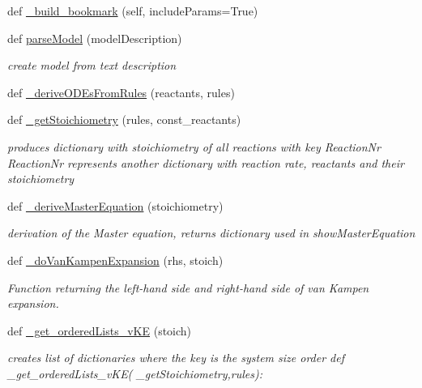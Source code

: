 \begin{DoxyCompactItemize}
def \hyperlink{namespace_mu_mo_t_1_1_mu_mo_t_a85df0ce1bbaa77b9e7bb2c86580ddbb1}{\+\_\+build\+\_\+bookmark} (self, include\+Params=True)
\item 
def \hyperlink{namespace_mu_mo_t_1_1_mu_mo_t_a8a03b36c690f28169c5c116d8e06116f}{parse\+Model} (model\+Description)
\begin{DoxyCompactList}\small\item\em create model from text description \end{DoxyCompactList}\item 
def \hyperlink{namespace_mu_mo_t_1_1_mu_mo_t_a139ce7eb800f1bebc88c8da1bea24d4f}{\+\_\+derive\+O\+D\+Es\+From\+Rules} (reactants, rules)
\item 
def \hyperlink{namespace_mu_mo_t_1_1_mu_mo_t_a6efd37b7d1bd1b5487b94a6083fa4eb4}{\+\_\+get\+Stoichiometry} (rules, const\+\_\+reactants)
\begin{DoxyCompactList}\small\item\em produces dictionary with stoichiometry of all reactions with key Reaction\+Nr Reaction\+Nr represents another dictionary with reaction rate, reactants and their stoichiometry \end{DoxyCompactList}\item 
def \hyperlink{namespace_mu_mo_t_1_1_mu_mo_t_a08c33c3f09bc345041d89861f4fb86af}{\+\_\+derive\+Master\+Equation} (stoichiometry)
\begin{DoxyCompactList}\small\item\em derivation of the Master equation, returns dictionary used in show\+Master\+Equation \end{DoxyCompactList}\item 
def \hyperlink{namespace_mu_mo_t_1_1_mu_mo_t_a740f34f3cdcc792a63fb50261b075020}{\+\_\+do\+Van\+Kampen\+Expansion} (rhs, stoich)
\begin{DoxyCompactList}\small\item\em Function returning the left-\/hand side and right-\/hand side of van Kampen expansion. \end{DoxyCompactList}\item 
def \hyperlink{namespace_mu_mo_t_1_1_mu_mo_t_aa4d9e72bb9834df8dc09115a251c1973}{\+\_\+get\+\_\+ordered\+Lists\+\_\+v\+KE} (stoich)
\begin{DoxyCompactList}\small\item\em creates list of dictionaries where the key is the system size order def \+\_\+get\+\_\+ordered\+Lists\+\_\+v\+K\+E( \+\_\+get\+Stoichiometry,rules)\+: \end{DoxyCompactList}\item 

\end{DoxyCompactItemize}

